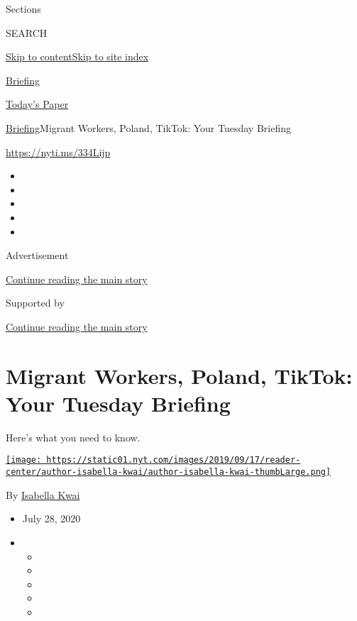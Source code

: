 Sections

SEARCH

\protect\hyperlink{site-content}{Skip to
content}\protect\hyperlink{site-index}{Skip to site index}

\href{https://www.nytimes.com/interactive/2018/briefing/global-morning-briefing-newsletter-signup.html}{Briefing}

\href{https://myaccount.nytimes.com/auth/login?response_type=cookie\&client_id=vi}{}

\href{https://www.nytimes.com/section/todayspaper}{Today's Paper}

\href{/interactive/2018/briefing/global-morning-briefing-newsletter-signup.html}{Briefing}\textbar{}Migrant
Workers, Poland, TikTok: Your Tuesday Briefing

\url{https://nyti.ms/334Lijp}

\begin{itemize}
\item
\item
\item
\item
\item
\end{itemize}

Advertisement

\protect\hyperlink{after-top}{Continue reading the main story}

Supported by

\protect\hyperlink{after-sponsor}{Continue reading the main story}

\hypertarget{migrant-workers-poland-tiktok-your-tuesday-briefing}{%
\section{Migrant Workers, Poland, TikTok: Your Tuesday
Briefing}\label{migrant-workers-poland-tiktok-your-tuesday-briefing}}

Here's what you need to know.

\href{https://www.nytimes.com/by/isabella-kwai}{\texttt{[image: https://static01.nyt.com/images/2019/09/17/reader-center/author-isabella-kwai/author-isabella-kwai-thumbLarge.png]}}

By \href{https://www.nytimes.com/by/isabella-kwai}{Isabella Kwai}

\begin{itemize}
\item
  July 28, 2020
\item
  \begin{itemize}
  \item
  \item
  \item
  \item
  \item
  \end{itemize}
\end{itemize}

